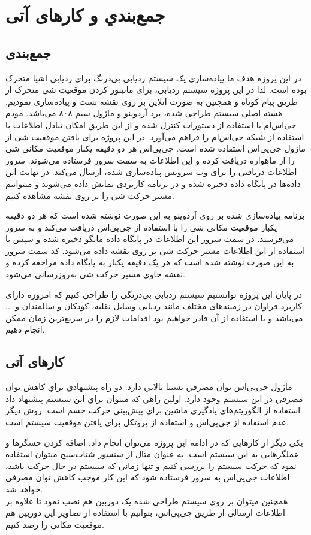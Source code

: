 \chapter{جمع‌بندي و کارهای آتی}
\section{جمع‌بندی}
در این پروژه هدف ما پیاده‌سازی یک سیستم ردیابی بی‌درنگ برای ردیابی اشیا متحرک بوده است.  لذا در این پروژه سیستم ردیابی، برای مانیتور کردن موقعیت شی متحرک از طریق پیام کوتاه و همچنین به صورت آنلاین بر روی نقشه تست و پیاده‌سازی نمودیم. هسته اصلی سیستم طراحی شده، برد آردوینو و ماژول سیم ۸۰۸ می‌باشد. مودم جی‌اس‌ام با استفاده از دستورات  کنترل شده و از این طریق امکان تبادل اطلاعات با استفاده از شبکه جی‌اس‌ام را فراهم می‌آورد. در این پروژه برای یافتن موقعیت شی از ماژول جی‌پی‌اس استفاده شده است. جی‌پی‌اس هر دو دقیقه یکبار موقعیت مکانی شی را از ماهواره دریافت کرده و این اطلاعات به سمت سرور فرستاده می‌شوند. سرور اطلاعات دریافتی را برای وب سرویس پیاده‌سازی شده، ارسال می‌کند. در نهایت این داده‌ها در پایگاه داده ذخیره شده و در برنامه کاربردی نمایش داده می‌شوند و میتوانیم مسیر حرکت شی را بر روی نقشه مشاهده کنیم.


برنامه پیاده‌سازی شده بر روی آردوینو به این صورت نوشته شده است که هر دو دقیقه یکبار موقعیت مکانی شی را با استفاده از جی‌پی‌اس دریافت می‌کند و به سرور می‌فرستد. در سمت سرور  این اطلاعات در پایگاه داده مانگو ذخیره شده و سپس با استفاده از این اطلاعات مسیر حرکت شی بر روی نقشه داده می‌شود. کد سمت سرور به این صورت نوشته شده است که هر یک دقیقه یکبار به پایگاه داده مراجعه کرده و نقشه حاوی مسیر حرکت شی به‌روزرسانی می‌شود.


در پایان این پروژه توانستیم سیستم ردیابی بی‌درنگی را  طراحی کنیم که امروزه دارای کاربرد فراوان در زمینه‌های مختلف مانند ردیابی وسایل نقلیه، کودکان و سالمندان و ... می‌باشد و با استفاده از آن قادر خواهیم بود اقدامات لازم را در سریع‌ترین زمان ممکن انجام دهیم.
\section{کارهای آتی}
ماژول جی‌پی‌اس توان مصرفي نسبتا بالايي دارد. دو راه پيشنهادي براي كاهش توان مصرفي در اين سيستم وجود دارد. اولين راهي كه ميتوان براي اين سيستم پيشنهاد داد استفاده از الگوريتم‌های يادگیری ماشین براي پيش‌بيني حركب جسم است. روش ديگر عدم استفاده از جی‌پی‌اس و استفاده از پروتكل  برای یافتن موقعیت سیستم است.


یکی دیگر از کارهایی که در ادامه این پروژه می‌توان انجام داد، اضافه کردن حسگرها و عملگرهایی به این سیستم است. به عنوان مثال از سنسور شتاب‌سنج میتوان استفاده نمود که حرکت سیستم را بررسی کنیم و تنها زمانی که سیستم در حال حرکت باشد، اطلاعات جی‌پی‌اس به سرور فرستاده شود که این کار موجب کاهش توان مصرفی خواهد شد.\\
همچنین میتوان بر روی سیستم طراحی شده یک دوربین هم نصب نمود تا علاوه بر اطلاعات ارسالی از طریق جی‌پی‌اس، بتوانیم با استفاده از تصاویر این دوربین هم موقعیت مکانی  را رصد کنیم.


